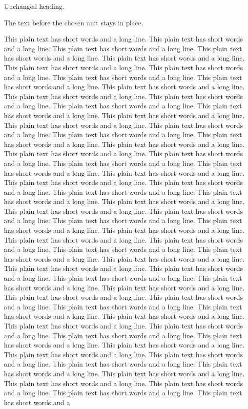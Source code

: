 \documentclass[11pt]{article}
\begin{document}
Unchanged heading.

The text before the chosen unit stays in place.

This plain text has short words and a long line. This plain text has short words and a long line. This plain text has short words and a long line. This plain text has short words and a long line. This plain text has short words and a long line. This plain text has short words and a long line. This plain text has short words and a long line. This plain text has short words and a long line. This plain text has short words and a long line. This plain text has short words and a long line. This plain text has short words and a long line. This plain text has short words and a long line. This plain text has short words and a long line. This plain text has short words and a long line. This plain text has short words and a long line. This plain text has short words and a long line. This plain text has short words and a long line. This plain text has short words and a long line. This plain text has short words and a long line. This plain text has short words and a long line. This plain text has short words and a long line. This plain text has short words and a long line. This plain text has short words and a long line. This plain text has short words and a long line. This plain text has short words and a long line. This plain text has short words and a long line. This plain text has short words and a long line. This plain text has short words and a long line. This plain text has short words and a long line. This plain text has short words and a long line. This plain text has short words and a long line. This plain text has short words and a long line. This plain text has short words and a long line. This plain text has short words and a long line. This plain text has short words and a long line. This plain text has short words and a long line. This plain text has short words and a long line. This plain text has short words and a long line. This plain text has short words and a long line. This plain text has short words and a long line. This plain text has short words and a long line. This plain text has short words and a long line. This plain text has short words and a long line. This plain text has short words and a long line. This plain text has short words and a long line. This plain text has short words and a long line. This plain text has short words and a long line. This plain text has short words and a long line. This plain text has short words and a long line. This plain text has short words and a long line. This plain text has short words and a long line. This plain text has short words and a long line. This plain text has short words and a long line. This plain text has short words and a long line. This plain text has short words and a long line. This plain text has short words and a long line. This plain text has short words and a long line. This plain text has short words and a long line. This plain text has short words and a long line. This plain text has short words and a long line. This plain text has short words and a long line. This plain text has short words and a long line. This plain text has short words and a long line. This plain text has short words and a 
\end{document}
